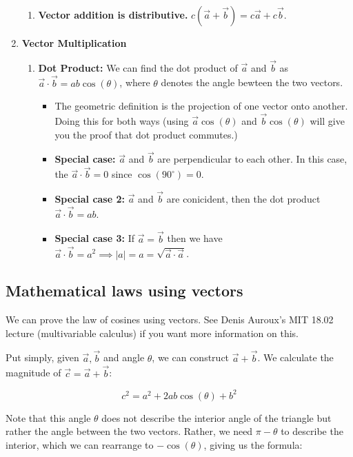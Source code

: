 \documentclass{article}
\theoremstyle{definition}
\numberwithin{equation}{section}
\numberwithin{definition}{section}
\begin{document}
\begin{enumerate}
\begin{enumerate}
		\item \textbf{Vector addition is distributive.} $c(\vec{a} + \vec{b}) = c\vec{a} + c\vec{b}$.
	\end{enumerate}

	\item \textbf{Vector Multiplication}
	\begin{enumerate}
		\item \textbf{Dot Product:} We can find the dot product of $\vec{a}$ and $\vec{b}$ as $\vec{a} \cdot \vec{b} = ab \cos(\theta)$, where $\theta$ denotes the angle bewteen the two vectors.
		\begin{itemize}
			\item The geometric definition is the projection of one vector onto another. Doing this for both ways (using $\vec{a} \cos(\theta)$ and $\vec{b} \cos(\theta)$ will give you the proof that dot product commutes.)
			\item \textbf{Special case:} $\vec{a}$ and $\vec{b}$ are perpendicular to each other. In this case, the $\vec{a} \cdot \vec{b} = 0$ since $\cos(90^\circ)= 0$. 
			\item \textbf{Special case 2:} $\vec{a}$ and $\vec{b}$ are conicident, then the dot product $\vec{a} \cdot \vec{b} = ab$. 
			\item \textbf{Special case 3:} If $\vec{a} = \vec{b}$ then we have $\vec{a} \cdot \vec{b} = a^2 \implies |a| = a = \sqrt{\vec{a} \cdot \vec{a}}$. 
		\end{itemize}
	\end{enumerate}
\end{enumerate}

\subsection{Mathematical laws using vectors}

We can prove the law of cosines using vectors. See Denis Auroux's MIT 18.02 lecture (multivariable calculus) if you want more information on this.

\medskip

Put simply, given $\vec{a}, \vec{b}$ and angle $\theta$, we can construct $\vec{a} + \vec{b}$. We calculate the magnitude of $\vec{c} = \vec{a} + \vec{b}$:

\[ c^2 = a^2 + 2ab \cos(\theta) + b^2\]

Note that this angle $\theta$ does not describe the interior angle of the triangle but rather the angle between the two vectors. Rather, we need $\pi - \theta$ to describe the interior, which we can rearrange to $-\cos(\theta)$, giving us the formula:
\end{document}
